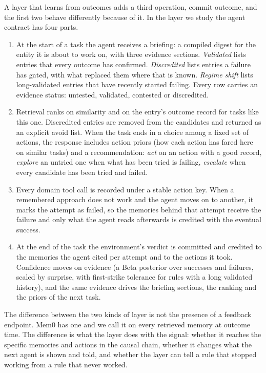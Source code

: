 \documentclass[11pt]{article}
\begin{document}
A layer that learns from outcomes adds a third operation, commit outcome, and the first two
behave differently because of it. In the layer we study the agent contract has four parts.

\begin{enumerate}[leftmargin=1.6em, itemsep=2pt]
\item At the start of a task the agent receives a briefing: a compiled digest for the entity
  it is about to work on, with three evidence sections. \emph{Validated} lists entries that
  every outcome has confirmed. \emph{Discredited} lists entries a failure has gated, with what
  replaced them where that is known. \emph{Regime shift} lists long-validated entries that have
  recently started failing. Every row carries an evidence status: untested, validated,
  contested or discredited.
\item Retrieval ranks on similarity and on the entry's outcome record for tasks like this one.
  Discredited entries are removed from the candidates and returned as an explicit avoid list.
  When the task ends in a choice among a fixed set of actions, the response includes action
  priors (how each action has fared here on similar tasks) and a recommendation: \emph{act} on
  an action with a good record, \emph{explore} an untried one when what has been tried is
  failing, \emph{escalate} when every candidate has been tried and failed.
\item Every domain tool call is recorded under a stable action key. When a remembered approach
  does not work and the agent moves on to another, it marks the attempt as failed, so the
  memories behind that attempt receive the failure and only what the agent reads afterwards is
  credited with the eventual success.
\item At the end of the task the environment's verdict is committed and credited to the
  memories the agent cited per attempt and to the actions it took. Confidence moves on evidence
  (a Beta posterior over successes and failures, scaled by surprise, with first-strike tolerance
  for rules with a long validated history), and the same evidence drives the briefing sections,
  the ranking and the priors of the next task.
\end{enumerate}

The difference between the two kinds of layer is not the presence of a feedback endpoint. Mem0
has one and we call it on every retrieved memory at outcome time. The difference is what the
layer does with the signal: whether it reaches the specific memories and actions in the causal
chain, whether it changes what the next agent is shown and told, and whether the layer can tell
a rule that stopped working from a rule that never worked.
\end{document}
